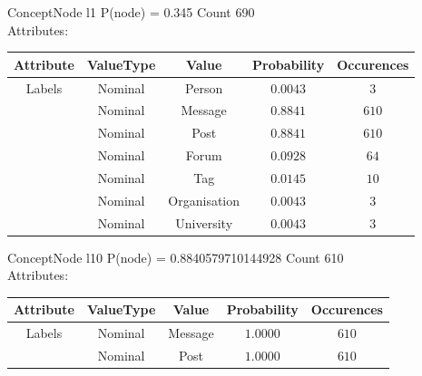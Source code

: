  
ConceptNode l1 \hspace{1cm} P(node) = 0.345 \hspace{1cm} Count 690
\\ Attributes: \\ 
 \begin{table}[h] 
  \centering 
 \begin{longtable}{|c|c|c|c|c|} \hline 
Attribute & ValueType & Value & Probability & Occurences \\ \hline 
\multirow{7}{*}{Labels} & Nominal & Person & $0.0043$ & $3$ \\ \cline{2-5} 
 & Nominal & Message & $0.8841$ & $610$ \\ \cline{2-5} 
 & Nominal & Post & $0.8841$ & $610$ \\ \cline{2-5} 
 & Nominal & Forum & $0.0928$ & $64$ \\ \cline{2-5} 
 & Nominal & Tag & $0.0145$ & $10$ \\ \cline{2-5} 
 & Nominal & Organisation & $0.0043$ & $3$ \\ \cline{2-5} 
 & Nominal & University & $0.0043$ & $3$ \\ \hline 
\end{longtable}
 \end{table} 


 
ConceptNode l10 \hspace{1cm} P(node) = 0.8840579710144928 \hspace{1cm} Count 610
\\ Attributes: \\ 
 \begin{table}[h] 
  \centering 
 \begin{longtable}{|c|c|c|c|c|} \hline 
Attribute & ValueType & Value & Probability & Occurences \\ \hline 
\multirow{2}{*}{Labels} & Nominal & Message & $1.0000$ & $610$ \\ \cline{2-5} 
 & Nominal & Post & $1.0000$ & $610$ \\ \hline 
\end{longtable}
 \end{table} 



